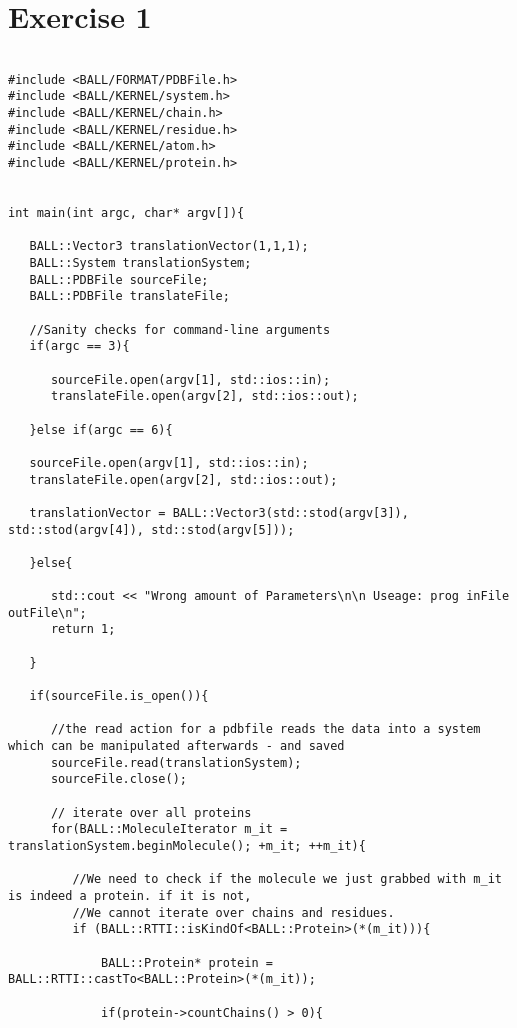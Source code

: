 \documentclass[11pt]{article}
\begin{document}
\date{\today}

\section{Exercise 1}

\begin{lstlisting}

#include <BALL/FORMAT/PDBFile.h>
#include <BALL/KERNEL/system.h>
#include <BALL/KERNEL/chain.h>
#include <BALL/KERNEL/residue.h>
#include <BALL/KERNEL/atom.h>
#include <BALL/KERNEL/protein.h>


int main(int argc, char* argv[]){

   BALL::Vector3 translationVector(1,1,1);
   BALL::System translationSystem;
   BALL::PDBFile sourceFile;
   BALL::PDBFile translateFile;

   //Sanity checks for command-line arguments
   if(argc == 3){

      sourceFile.open(argv[1], std::ios::in);
      translateFile.open(argv[2], std::ios::out);

   }else if(argc == 6){

   sourceFile.open(argv[1], std::ios::in);
   translateFile.open(argv[2], std::ios::out);
  
   translationVector = BALL::Vector3(std::stod(argv[3]), std::stod(argv[4]), std::stod(argv[5]));

   }else{

      std::cout << "Wrong amount of Parameters\n\n Useage: prog inFile outFile\n";
      return 1;

   }

   if(sourceFile.is_open()){

      //the read action for a pdbfile reads the data into a system which can be manipulated afterwards - and saved
      sourceFile.read(translationSystem);
      sourceFile.close();

      // iterate over all proteins
      for(BALL::MoleculeIterator m_it = translationSystem.beginMolecule(); +m_it; ++m_it){

         //We need to check if the molecule we just grabbed with m_it is indeed a protein. if it is not,
         //We cannot iterate over chains and residues.
         if (BALL::RTTI::isKindOf<BALL::Protein>(*(m_it))){

             BALL::Protein* protein = BALL::RTTI::castTo<BALL::Protein>(*(m_it));

             if(protein->countChains() > 0){


\end{lstlisting}
\end{document}
